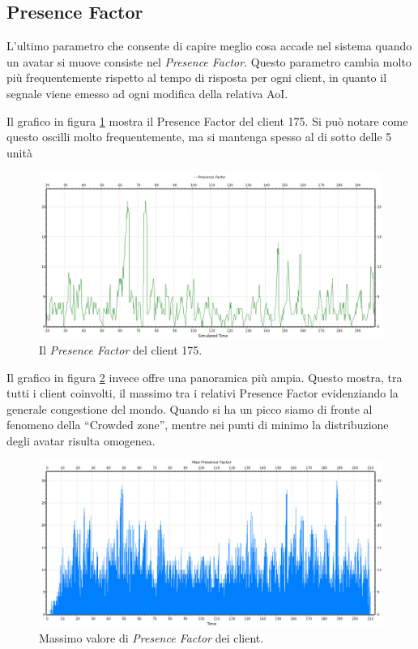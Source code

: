 \documentclass[a4paper, 11pt, oneside]{book}
\theoremstyle{definition}
\theoremstyle{remark}
\begin{document}
\subsection{Presence Factor}
L'ultimo parametro che consente di capire meglio cosa accade nel sistema
quando un avatar si muove consiste nel \emph{Presence Factor}. Questo parametro
cambia molto più frequentemente rispetto al tempo di risposta per ogni client,
in quanto il segnale viene emesso ad ogni modifica della relativa AoI.

Il grafico in figura \ref{presence} mostra il Presence Factor del client 175.
Si può notare come questo oscilli molto frequentemente, ma si mantenga spesso
al di sotto delle 5 unità

\begin{figure}
\begin{center}
\includegraphics[scale=0.4]{presence.jpeg}
\end{center}
\caption{Il \emph{Presence Factor} del client 175.}
\label{presence}
\end{figure}

Il grafico in figura \ref{maxPresence} invece offre una panoramica più ampia.
Questo mostra, tra tutti i client coinvolti, il massimo tra i relativi
Presence Factor evidenziando la generale congestione del mondo. Quando si ha un
picco siamo di fronte al fenomeno della ``Crowded zone'', mentre nei punti
di minimo la distribuzione degli avatar risulta omogenea.

\begin{figure}
\begin{center}
\includegraphics[scale=0.4]{maxPresenceFactor.jpeg}
\end{center}
\caption{Massimo valore di \emph{Presence Factor} dei client.}
\label{maxPresence}
\end{figure}
\end{document}
